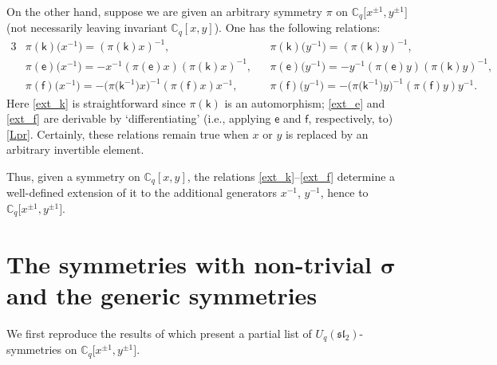 \documentclass[10pt,a4paper]{amsart}
\numberwithin{equation}{section}
\begin{document}
On the other hand, suppose we are given an arbitrary symmetry $\pi$ on
$\mathbb{C}_q\big[x^{\pm 1},y^{\pm 1}\big]$ (not necessarily leaving invariant
$\mathbb{C}_q[x,y]$). One has the following relations:
\begin{alignat}{3}
&\pi(\mathsf{k})\big(x^{-1}\big)=(\pi(\mathsf{k})x)^{-1}, & & \pi(\mathsf{k})\big(y^{-1}\big)=(\pi(\mathsf{k})y)^{-1}, & \label{ext_k}\\
& \pi(\mathsf{e})\big(x^{-1}\big)=-x^{-1}(\pi(\mathsf{e})x)(\pi(\mathsf{k})x)^{-1}, & & \pi(\mathsf{e})\big(y^{-1}\big) =-y^{-1}(\pi(\mathsf{e})y)(\pi(\mathsf{k})y)^{-1}, & \label{ext_e}\\
& \pi(\mathsf{f})\big(x^{-1}\big)=-\big(\pi\big(\mathsf{k}^{-1}\big)x\big)^{-1}(\pi(\mathsf{f})x)x^{-1}, \ \ \, & & \pi(\mathsf{f})\big(y^{-1}\big)=-\big(\pi\big(\mathsf{k}^{-1}\big)y\big)^{-1}(\pi(\mathsf{f})y)y^{-1}.\!\!\!\! &\label{ext_f}
\end{alignat}
Here \eqref{ext_k} is straightforward since $\pi(\mathsf{k})$ is an automorphism; \eqref{ext_e} and \eqref{ext_f} are derivable by `differentiating' (i.e., applying $\mathsf{e}$ and $\mathsf{f}$, respectively, to) \eqref{Lpr}. Certainly, these relations remain true when $x$ or $y$ is replaced by an arbitrary invertible element.

Thus, given a symmetry on $\mathbb{C}_q[x,y]$, the relations \eqref{ext_k}--\eqref{ext_f} determine a well-defined extension of it to the additional generators $x^{-1}$, $y^{-1}$, hence to $\mathbb{C}_q\big[x^{\pm 1},y^{\pm 1}\big]$.

\section[The symmetries with non-trivial $\sigma$ and the generic symmetries]{The symmetries with non-trivial $\boldsymbol{\sigma}$\\ and the generic symmetries}\label{nw}

We first reproduce the results of \cite{S} which present a partial list of $U_q(\mathfrak{sl}_2)$-symmetries on $\mathbb{C}_q\big[x^{\pm 1},y^{\pm 1}\big]$.
\end{document}
